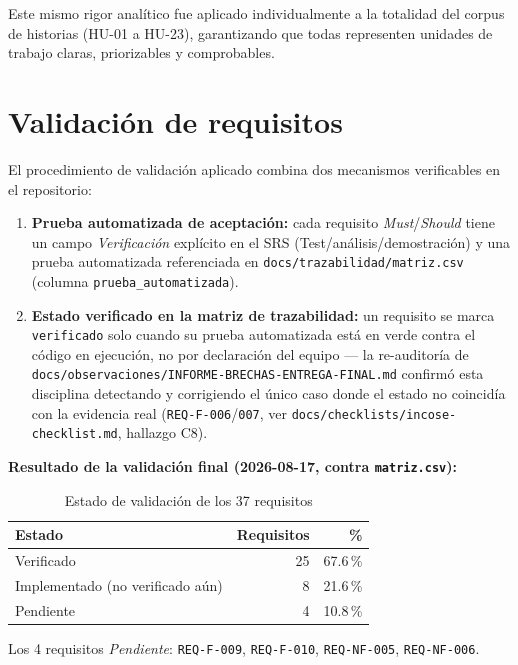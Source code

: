 Este mismo rigor analítico fue aplicado individualmente a la totalidad del corpus de historias (HU-01 a HU-23), garantizando que todas representen unidades de trabajo claras, priorizables y comprobables.

\section{Validación de requisitos}

El procedimiento de validación aplicado combina dos mecanismos
verificables en el repositorio:

\begin{enumerate}
  \item \textbf{Prueba automatizada de aceptación:} cada requisito
    \emph{Must}/\emph{Should} tiene un campo \emph{Verificación} explícito
    en el SRS (Test/análisis/demostración) y una prueba automatizada
    referenciada en \texttt{docs/trazabilidad/matriz.csv} (columna
    \texttt{prueba\_automatizada}).
  \item \textbf{Estado verificado en la matriz de trazabilidad:} un
    requisito se marca \texttt{verificado} solo cuando su prueba
    automatizada está en verde contra el código en ejecución, no por
    declaración del equipo --- la re-auditoría de
    \texttt{docs/observaciones/INFORME-BRECHAS-ENTREGA-FINAL.md} confirmó
    esta disciplina detectando y corrigiendo el único caso donde el
    estado no coincidía con la evidencia real
    (\texttt{REQ-F-006}/\texttt{007}, ver
    \texttt{docs/checklists/incose-checklist.md}, hallazgo C8).
\end{enumerate}

\textbf{Resultado de la validación final (2026-08-17, contra \texttt{matriz.csv}):}

\begin{table}[H]
\centering
\caption{Estado de validación de los 37 requisitos}
\label{tab:validacion-req}
\begin{tabular}{@{}lrr@{}}
\toprule
\textbf{Estado} & \textbf{Requisitos} & \textbf{\%} \\
\midrule
Verificado                          & 25 & 67.6\,\% \\
Implementado (no verificado aún)    &  8 & 21.6\,\% \\
Pendiente                           &  4 & 10.8\,\% \\
\bottomrule
\end{tabular}
\vspace{0.3em}

{\footnotesize Los 4 requisitos \emph{Pendiente}: \texttt{REQ-F-009},
\texttt{REQ-F-010}, \texttt{REQ-NF-005}, \texttt{REQ-NF-006}.}
\end{table}

